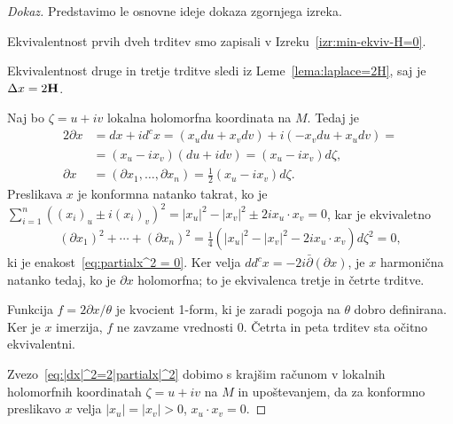 \documentclass[12pt,a4paper,twoside]{article}
\theoremstyle{definition} %
\newenvironment{dokaz}[1][Dokaz]{\begin{proof}[#1]}{\end{proof}}
\theoremstyle{plain} %
\numberwithin{equation}{section}  %
\begin{document}
\begin{dokaz}
Predstavimo le osnovne ideje dokaza zgornjega izreka.

Ekvivalentnost prvih dveh trditev smo zapisali v Izreku~\ref{izr:min-ekviv-H=0}.

Ekvivalentnost druge in tretje trditve sledi iz Leme~\ref{lema:laplace=2H}, saj je $\Delta x = 2 \textbf{\textup{H}}$.

Naj bo $\zeta = u + iv$ lokalna holomorfna koordinata na $M$. Tedaj je
\begin{align*}
2\partial x &= dx + id^{c}x = (x_{u}du + x_{v}dv) + i(-x_{v}du + x_{u}dv) = \\ 
	&= (x_{u} - ix_{v})(du + idv) = (x_{u} - ix_{v})d\zeta, \\
\partial x  &= (\partial x_{1}, \dots , \partial x_{n}) = \frac{1}{2}  (x_{u} - ix_{v})d\zeta.
\end{align*}
Preslikava $x$ je konformna natanko takrat, ko je $\sum_{i=1}^{n} \left((x_{i})_{u} \pm i(x_{i})_{v}\right)^2 = |x_{u}|^2 - |x_{v}|^2 \pm 2ix_{u} \cdot x_{v} = 0$, kar je ekvivaletno 
\begin{align*}
(\partial x_1)^2 + \cdots + (\partial x_{n})^2 = \frac{1}{4} \left(|x_{u}|^2 - |x_{v}|^2 - 2ix_{u} \cdot x_{v} \right) d\zeta ^2 = 0,
\end{align*}
ki je enakost~\eqref{eq:partialx^2 = 0}. Ker velja $dd^{c}x = -2i \bar{\partial} (\partial x)$, je $x$ harmonična natanko tedaj, ko je $\partial x$ holomorfna; to je ekvivalenca tretje in četrte trditve.

Funkcija $f = 2 \partial x / \theta$ je kvocient 1-form, ki je zaradi pogoja na $\theta$ dobro definirana. Ker je $x$ imerzija, $f$ ne zavzame vrednosti $0$. Četrta in peta trditev sta očitno ekvivalentni.

Zvezo~\eqref{eq:|dx|^2=2|partialx|^2} dobimo s krajšim računom v lokalnih holomorfnih koordinatah $\zeta = u + iv$ na $M$ in upoštevanjem, da za konformno preslikavo $x$ velja $|x_{u}|=|x_{v}|>0$, $x_{u} \cdot x_{v} = 0$.
\end{dokaz}
\end{document}
